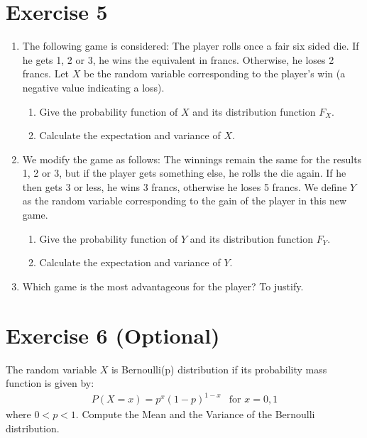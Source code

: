 \documentclass[12pt,thmsa]{article}\usepackage[]{graphicx}\usepackage[]{color}
\begin{document}
\section*{Exercise 5} %

\begin{enumerate}
\item The following game is considered: The player rolls once a fair six sided die. If he gets 1, 2 or 3, he wins the equivalent in francs. Otherwise, he loses 2 francs. Let $ X $ be the random variable corresponding to the player's win (a negative value indicating a loss).

\begin{enumerate}%
\item Give the probability function of $X$ and its distribution function $F_X$.
\item Calculate the expectation and variance of $X$.
\end{enumerate}

\item We modify the game as follows: The winnings remain the same for the results 1, 2 or 3, but if the player gets something else, he rolls the die again. If he then gets 3 or less, he wins 3 francs, otherwise he loses 5 francs. We define $Y$ as the random variable corresponding to the gain of the player in this new game.

\begin{enumerate}%
\item Give the probability function of $Y$ and its distribution function $F_Y$.
\item Calculate the expectation and variance of $Y$.
\end{enumerate}

\item Which game is the most advantageous for the player? To justify.

\end{enumerate}



\section*{Exercise 6 (Optional)}
The random variable $ X $ is Bernoulli(p) distribution if its probability mass function is given by:
\begin{align*}
P(X=x)=p^{x}(1-p)^{1-x} & \text{for } x=0,1
\end{align*}
where $ 0<p<1 $.
Compute the Mean and the Variance of the Bernoulli distribution.
\end{document}

